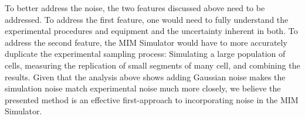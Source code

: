 		To better address the noise, the two features discussed above need to be addressed.
		To address the first feature, one would need to fully understand the experimental procedures and equipment and the uncertainty inherent in both.
		To address the second feature, the MIM Simulator would have to more accurately duplicate the experimental sampling process:
		Simulating a large population of cells, measuring the replication of small segments of many cell, and combining the results.
		Given that the analysis above shows adding Gaussian noise makes the simulation noise match experimental noise much more closely, we believe the presented method is an effective first-approach to incorporating noise in the MIM Simulator.









































